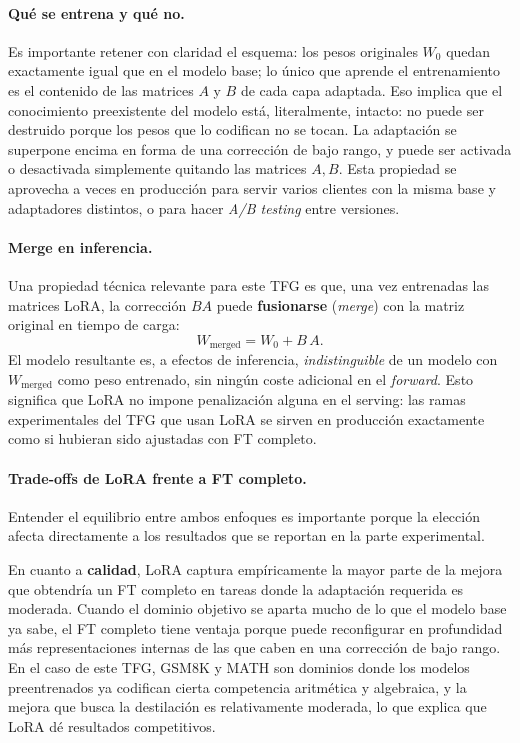 \documentclass[11pt,a4paper]{article}
\begin{document}
\paragraph{Qué se entrena y qué no.} Es importante retener con claridad el esquema: los pesos originales $W_0$ quedan exactamente igual que en el modelo base; lo único que aprende el entrenamiento es el contenido de las matrices $A$ y $B$ de cada capa adaptada. Eso implica que el conocimiento preexistente del modelo está, literalmente, intacto: no puede ser destruido porque los pesos que lo codifican no se tocan. La adaptación se superpone encima en forma de una corrección de bajo rango, y puede ser activada o desactivada simplemente quitando las matrices $A,B$. Esta propiedad se aprovecha a veces en producción para servir varios clientes con la misma base y adaptadores distintos, o para hacer \textit{A/B testing} entre versiones.

\paragraph{Merge en inferencia.} Una propiedad técnica relevante para este TFG es que, una vez entrenadas las matrices LoRA, la corrección $BA$ puede \textbf{fusionarse} (\textit{merge}) con la matriz original en tiempo de carga:
\[
W_{\text{merged}} = W_0 + B\,A.
\]
El modelo resultante es, a efectos de inferencia, \emph{indistinguible} de un modelo con $W_{\text{merged}}$ como peso entrenado, sin ningún coste adicional en el \textit{forward}. Esto significa que LoRA no impone penalización alguna en el serving: las ramas experimentales del TFG que usan LoRA se sirven en producción exactamente como si hubieran sido ajustadas con FT completo.

\paragraph{Trade-offs de LoRA frente a FT completo.} Entender el equilibrio entre ambos enfoques es importante porque la elección afecta directamente a los resultados que se reportan en la parte experimental.

En cuanto a \textbf{calidad}, LoRA captura empíricamente la mayor parte de la mejora que obtendría un FT completo en tareas donde la adaptación requerida es moderada. Cuando el dominio objetivo se aparta mucho de lo que el modelo base ya sabe, el FT completo tiene ventaja porque puede reconfigurar en profundidad más representaciones internas de las que caben en una corrección de bajo rango. En el caso de este TFG, GSM8K y MATH son dominios donde los modelos preentrenados ya codifican cierta competencia aritmética y algebraica, y la mejora que busca la destilación es relativamente moderada, lo que explica que LoRA dé resultados competitivos.
\end{document}
